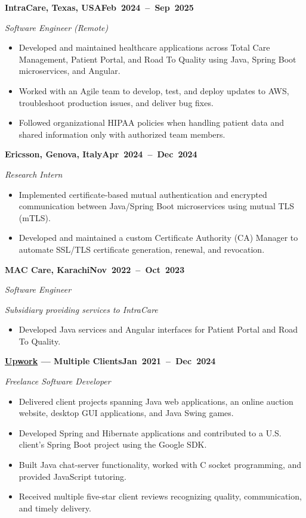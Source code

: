 \documentclass[a4paper]{article}
\newcommand{\cventry}[3]{%
  \par\addvspace{3pt}\Needspace{3.5\baselineskip}%
  \textbf{#2}\hfill\mbox{\textbf{#3}}\par\nopagebreak
  \textit{#1}\par\nopagebreak
}
\begin{document}
\cventry{Software Engineer (Remote)}{IntraCare, Texas, USA}{Feb 2024 -- Sep 2025}
\begin{itemize}
  \item Developed and maintained healthcare applications across Total Care Management, Patient Portal, and Road To Quality using Java, Spring Boot microservices, and Angular.
  \item Worked with an Agile team to develop, test, and deploy updates to AWS, troubleshoot production issues, and deliver bug fixes.
  \item Followed organizational HIPAA policies when handling patient data and shared information only with authorized team members.
\end{itemize}

\cventry{Research Intern}{Ericsson, Genova, Italy}{Apr 2024 -- Dec 2024}
\begin{itemize}
  \item Implemented certificate-based mutual authentication and encrypted communication between Java/Spring Boot microservices using mutual TLS (mTLS).
  \item Developed and maintained a custom Certificate Authority (CA) Manager to automate SSL/TLS certificate generation, renewal, and revocation.
\end{itemize}

\cventry{Software Engineer}{MAC Care, Karachi}{Nov 2022 -- Oct 2023}
\textit{Subsidiary providing services to IntraCare}
\begin{itemize}
  \item Developed Java services and Angular interfaces for Patient Portal and Road To Quality.
\end{itemize}

\cventry{Freelance Software Developer}{\href{https://www.upwork.com/freelancers/~01bba43fe979cc6574}{Upwork} --- Multiple Clients}{Jan 2021 -- Dec 2024}
\begin{itemize}
  \item Delivered client projects spanning Java web applications, an online auction website, desktop GUI applications, and Java Swing games.
  \item Developed Spring and Hibernate applications and contributed to a U.S. client's Spring Boot project using the Google SDK.
  \item Built Java chat-server functionality, worked with C socket programming, and provided JavaScript tutoring.
  \item Received multiple five-star client reviews recognizing quality, communication, and timely delivery.
\end{itemize}
\end{document}
